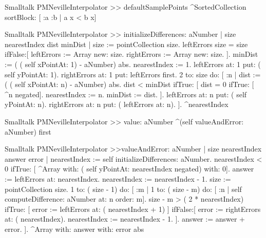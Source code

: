 \begin{displaycode}{Smalltalk}
PMNevilleInterpolator >> defaultSamplePoints
    ^SortedCollection sortBlock: [ :a :b | a x < b x]
\end{displaycode}

\begin{displaycode}{Smalltalk}
PMNevilleInterpolator >> initializeDifferences: aNumber
    | size nearestIndex dist minDist |
    size := pointCollection size.
    leftErrors size = size
        ifFalse:[ leftErrors := Array new: size.
                  rightErrors := Array new: size.
                ].
    minDist := ( ( self xPointAt: 1) - aNumber) abs.
    nearestIndex := 1.
    leftErrors at: 1 put: ( self yPointAt: 1).
    rightErrors at: 1 put: leftErrors first.
    2 to: size do:
        [ :n |
          dist := ( ( self xPointAt: n) - aNumber) abs.
          dist < minDist
            ifTrue: [ dist = 0
                        ifTrue: [ ^n negated].
                      nearestIndex := n.
                      minDist := dist.
                    ].
         leftErrors at: n put: ( self yPointAt: n).
         rightErrors at: n put: ( leftErrors at: n).
        ].
    ^nearestIndex
\end{displaycode}

\begin{displaycode}{Smalltalk}
PMNevilleInterpolator >> value: aNumber
    ^(self valueAndError: aNumber) first
\end{displaycode}

\begin{displaycode}{Smalltalk}
PMNevilleInterpolator >>valueAndError: aNumber
    | size nearestIndex answer error |
    nearestIndex := self initializeDifferences: aNumber.
    nearestIndex < 0
        ifTrue: [ ^Array with: ( self yPointAt: nearestIndex negated) 
                                                             with: 0].
    answer := leftErrors at: nearestIndex.
    nearestIndex := nearestIndex - 1.
    size := pointCollection size.
    1 to: ( size - 1) do:
        [ :m |
          1 to: ( size - m) do:
            [ :n | self computeDifference: aNumber at: n order: m].
          size - m > ( 2 * nearestIndex)
                ifTrue: [ error := leftErrors at: ( nearestIndex + 1) 
                                                                     ]
                ifFalse:[ error := rightErrors at: ( nearestIndex).
                              nearestIndex := nearestIndex - 1.
                            ].
          answer := answer + error.
        ].
    ^Array with: answer with: error abs

\end{displaycode}

